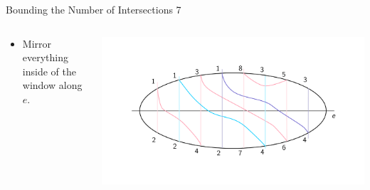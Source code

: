 \documentclass[10pt,aspectratio=169]{beamer}
\theoremstyle{plain}
\begin{document}
\begin{frame}{Bounding the Number of Intersections 7}
    \begin{columns}
    \begin{column}{0.35\textwidth}
        \begin{itemize}
            \item Mirror everything inside of the window along \(e\).
        \end{itemize}
    \end{column}
    \begin{column}{0.65\textwidth}
        \begin{center}
            \includegraphics[width=\textwidth]{images/figure-8.pdf}
        \end{center}
    \end{column}
    \end{columns}
\end{frame}
\end{document}

